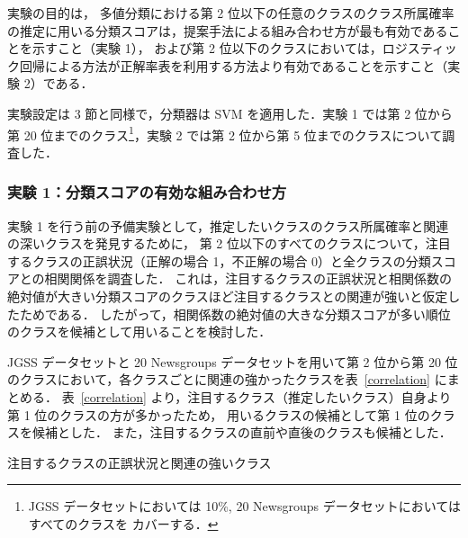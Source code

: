 \documentclass[japanese]{jnlp_1.4}
\begin{document}
実験の目的は，
多値分類における第 2 位以下の任意のクラスのクラス所属確率の推定に用いる分類スコアは，提案手法による組み合わせ方が最も有効であることを示すこと（実験 1），
および第 2 位以下のクラスにおいては，ロジスティック回帰による方法が正解率表を利用する方法より有効であることを示すこと（実験 2）である．

実験設定は 3 節と同様で，分類器は SVM を適用した．実験 1 では第 2 位から
第 20 位までのクラス\footnote{
	JGSS データセットにおいては 10\%, 20 Newsgroups データセットにおいてはすべてのクラスを
	カバーする．
}，実験 2 では第 2 位から第 5 位までのクラスについて調査した．


\subsubsection{実験 1：分類スコアの有効な組み合わせ方}


実験 1 を行う前の予備実験として，推定したいクラスのクラス所属確率と関連の深いクラスを発見するために，
第 2 位以下のすべてのクラスについて，注目するクラスの正誤状況（正解の場合 1，不正解の場合 0）と全クラスの分類スコアとの相関関係を調査した．
これは，注目するクラスの正誤状況と相関係数の絶対値が大きい分類スコアのクラスほど注目するクラスとの関連が強いと仮定したためである．
したがって，相関係数の絶対値の大きな分類スコアが多い順位のクラスを候補として用いることを検討した．

JGSS データセットと 20 Newsgroups データセットを用いて第 2 位から第 20 位のクラスにおいて，各クラスごとに関連の強かったクラスを表~\ref{correlation} にまとめる．
表~\ref{correlation} より，注目するクラス（推定したいクラス）自身より第 1 位のクラスの方が多かったため，
用いるクラスの候補として第 1 位のクラスを候補とした．
また，注目するクラスの直前や直後のクラスも候補とした．

\begin{table}[b]
\begin{center}
\caption{注目するクラスの正誤状況と関連の強いクラス}
\label{correlation}

\end{center}
\end{table}
\end{document}
